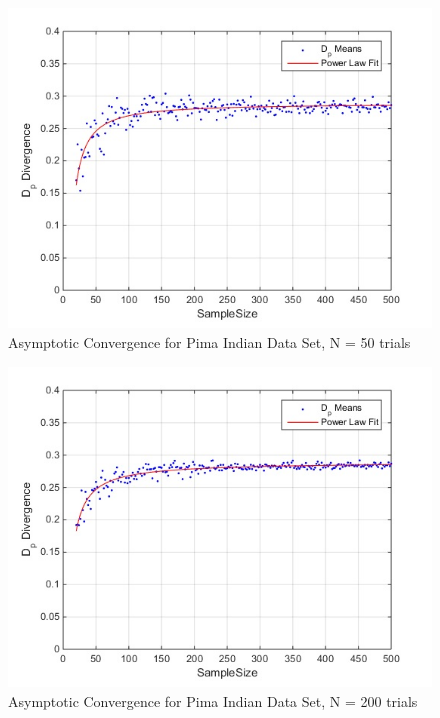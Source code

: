 \documentclass{article}
\begin{document}
	\begin{figure}[!h]
		\caption{Asymptotic Convergence for Pima Indian Data Set, N = 50 trials}
		\centering
		\includegraphics[scale=0.6]{dp_n50_pima}
	\end{figure}
	
	\begin{figure}[!h]
		\caption{Asymptotic Convergence for Pima Indian Data Set, N = 200 trials}
		\centering
		\includegraphics[scale=0.6]{dp_n200_pima}
	\end{figure}	
	
\end{document}
